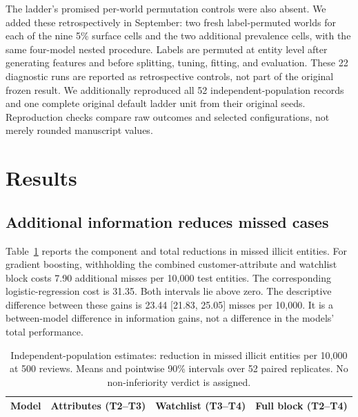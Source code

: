 \documentclass[11pt,a4paper]{article}
\begin{document}
The ladder's promised per-world permutation controls were also absent. We added these retrospectively in September: two fresh label-permuted worlds for each of the nine 5\% surface cells and the two additional prevalence cells, with the same four-model nested procedure. Labels are permuted at entity level after generating features and before splitting, tuning, fitting, and evaluation. These 22 diagnostic runs are reported as retrospective controls, not part of the original frozen result. We additionally reproduced all 52 independent-population records and one complete original default ladder unit from their original seeds. Reproduction checks compare raw outcomes and selected configurations, not merely rounded manuscript values.

\section{Results}
\subsection{Additional information reduces missed cases}
Table~\ref{tab:independent} reports the component and total reductions in missed illicit entities. For gradient boosting, withholding the combined customer-attribute and watchlist block costs 7.90 additional misses per 10,000 test entities. The corresponding logistic-regression cost is 31.35. Both intervals lie above zero. The descriptive difference between these gains is 23.44 [21.83, 25.05] misses per 10,000. It is a between-model difference in information gains, not a difference in the models' total performance.
\begin{table}[htbp]\centering\small
\caption{Independent-population estimates: reduction in missed illicit entities per 10,000 at 500 reviews. Means and pointwise 90\% intervals over 52 paired replicates. No non-inferiority verdict is assigned.}\label{tab:independent}
\begin{tabular}{lccc}\toprule Model & Attributes (T2--T3) & Watchlist (T3--T4) & Full block (T2--T4) \\\midrule
\end{tabular}
\end{table}
\end{document}

